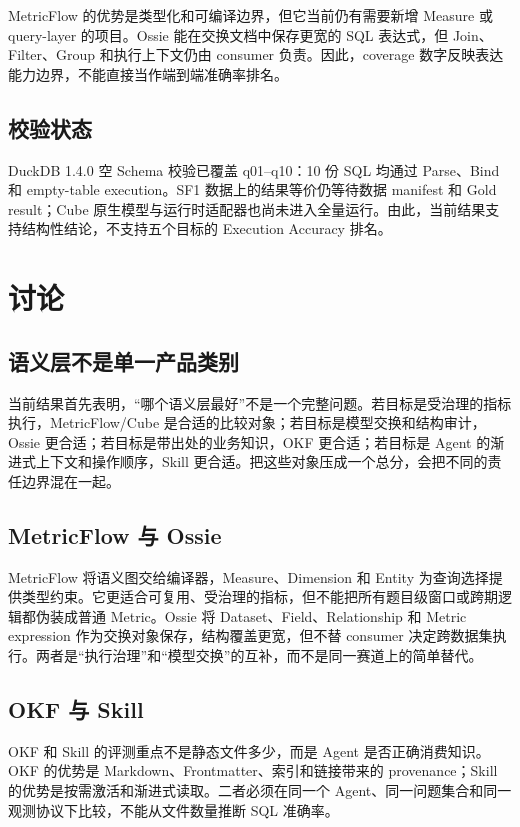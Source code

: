 \documentclass[UTF8,a4paper,12pt]{ctexart}
\begin{document}
MetricFlow 的优势是类型化和可编译边界，但它当前仍有需要新增 Measure 或 query-layer 的项目。Ossie 能在交换文档中保存更宽的 SQL 表达式，但 Join、Filter、Group 和执行上下文仍由 consumer 负责。因此，coverage 数字反映表达能力边界，不能直接当作端到端准确率排名。

\subsection{校验状态}

DuckDB 1.4.0 空 Schema 校验已覆盖 q01--q10：10 份 SQL 均通过 Parse、Bind 和 empty-table execution。SF1 数据上的结果等价仍等待数据 manifest 和 Gold result；Cube 原生模型与运行时适配器也尚未进入全量运行。由此，当前结果支持结构性结论，不支持五个目标的 Execution Accuracy 排名。

\section{讨论}

\subsection{语义层不是单一产品类别}

当前结果首先表明，“哪个语义层最好”不是一个完整问题。若目标是受治理的指标执行，MetricFlow/Cube 是合适的比较对象；若目标是模型交换和结构审计，Ossie 更合适；若目标是带出处的业务知识，OKF 更合适；若目标是 Agent 的渐进式上下文和操作顺序，Skill 更合适。把这些对象压成一个总分，会把不同的责任边界混在一起。

\subsection{MetricFlow 与 Ossie}

MetricFlow 将语义图交给编译器，Measure、Dimension 和 Entity 为查询选择提供类型约束。它更适合可复用、受治理的指标，但不能把所有题目级窗口或跨期逻辑都伪装成普通 Metric。Ossie 将 Dataset、Field、Relationship 和 Metric expression 作为交换对象保存，结构覆盖更宽，但不替 consumer 决定跨数据集执行。两者是“执行治理”和“模型交换”的互补，而不是同一赛道上的简单替代。

\subsection{OKF 与 Skill}

OKF 和 Skill 的评测重点不是静态文件多少，而是 Agent 是否正确消费知识。OKF 的优势是 Markdown、Frontmatter、索引和链接带来的 provenance；Skill 的优势是按需激活和渐进式读取。二者必须在同一个 Agent、同一问题集合和同一观测协议下比较，不能从文件数量推断 SQL 准确率。
\end{document}
